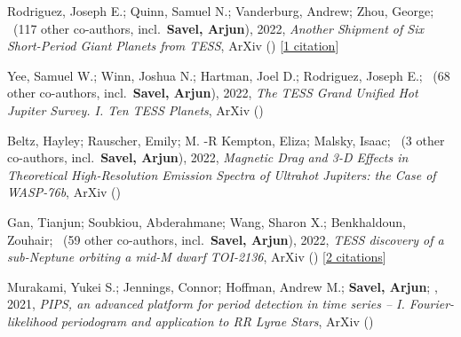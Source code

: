 \item[{\color{numcolor}\scriptsize5}] Rodriguez, Joseph E.; Quinn, Samuel N.; Vanderburg, Andrew; Zhou, George; \etal\ ({117} other co-authors, incl.\ \textbf{Savel, Arjun}), 2022, \emph{Another Shipment of Six Short-Period Giant Planets from TESS}, ArXiv () [\href{https://ui.adsabs.harvard.edu/abs/2022arXiv220505709R}{1 citation}]

\item[{\color{numcolor}\scriptsize4}] Yee, Samuel W.; Winn, Joshua N.; Hartman, Joel D.; Rodriguez, Joseph E.; \etal\ ({68} other co-authors, incl.\ \textbf{Savel, Arjun}), 2022, \emph{The TESS Grand Unified Hot Jupiter Survey. I. Ten TESS Planets}, ArXiv ()

\item[{\color{numcolor}\scriptsize3}] Beltz, Hayley; Rauscher, Emily; M. -R Kempton, Eliza; Malsky, Isaac; \etal\ ({3} other co-authors, incl.\ \textbf{Savel, Arjun}), 2022, \emph{Magnetic Drag and 3-D Effects in Theoretical High-Resolution Emission Spectra of Ultrahot Jupiters: the Case of WASP-76b}, ArXiv ()

\item[{\color{numcolor}\scriptsize2}] Gan, Tianjun; Soubkiou, Abderahmane; Wang, Sharon X.; Benkhaldoun, Zouhair; \etal\ ({59} other co-authors, incl.\ \textbf{Savel, Arjun}), 2022, \emph{TESS discovery of a sub-Neptune orbiting a mid-M dwarf TOI-2136}, ArXiv () [\href{https://ui.adsabs.harvard.edu/abs/2022arXiv220210024G}{2 citations}]

\item[{\color{numcolor}\scriptsize1}] Murakami, Yukei S.; Jennings, Connor; Hoffman, Andrew M.; \textbf{Savel, Arjun}; \etal, 2021, \emph{PIPS, an advanced platform for period detection in time series -- I. Fourier-likelihood periodogram and application to RR Lyrae Stars}, ArXiv ()